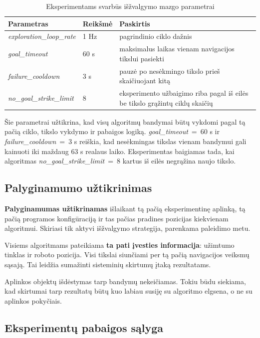 \documentclass[]{VUMIFTemplateClass}
\begin{document}
\begin{table}[H]
\centering
\caption{Eksperimentams svarbūs išžvalgymo mazgo parametrai}
\label{tab:config-params}
\small
\setlength{\tabcolsep}{5pt}
\begin{tabular}{|l|l|p{}|}
\hline
\textbf{Parametras} & \textbf{Reikšmė} & \textbf{Paskirtis} \\
\hline
\textit{exploration\_loop\_rate} & 1 Hz & pagrindinio ciklo dažnis \\
\hline
\textit{goal\_timeout} & 60 s & maksimalus laikas vienam navigacijos tikslui pasiekti \\
\hline
\textit{failure\_cooldown} & 3 s & pauzė po nesėkmingo tikslo prieš skaičiuojant kitą \\
\hline
\textit{no\_goal\_strike\_limit} & 8 & eksperimento užbaigimo riba pagal iš eilės be tikslo grąžintų ciklų skaičių \\
\hline
\end{tabular}
\end{table}

Šie parametrai užtikrina, kad visų algoritmų bandymai būtų vykdomi pagal tą pačią ciklo, tikslo vykdymo ir pabaigos logiką. \textit{goal\_timeout}~=~60 s ir
\textit{failure\_cooldown}~=~3 s reiškia, kad nesėkmingas tikslas vienam bandymui gali kainuoti iki maždaug 63 s realaus laiko. Eksperimentas baigiamas tada,
kai algoritmas \textit{no\_goal\_strike\_limit}~=~8 kartus iš eilės negrąžina naujo tikslo.

\subsection{Palyginamumo užtikrinimas}

\textbf{Palyginamumas užtikrinamas} išlaikant tą pačią eksperimentinę aplinką, tą pačią programos konfigūraciją ir tas pačias pradines pozicijas kiekvienam algoritmui.
Skiriasi tik aktyvi išžvalgymo strategija, parenkama paleidimo metu.

Visiems algoritmams pateikiama \textbf{ta pati įvesties informacija}: užimtumo tinklas ir roboto pozicija. Visi tikslai siunčiami per tą pačią navigacijos veiksmų sąsają.
Tai leidžia sumažinti sisteminių skirtumų įtaką rezultatams.

Aplinkos objektų išdėstymas tarp bandymų nekeičiamas. Tokiu būdu siekiama, kad skirtumai tarp rezultatų būtų kuo labiau susiję su algoritmo elgsena, o ne su
aplinkos pokyčiais.

\subsection{Eksperimentų pabaigos sąlyga}
\end{document}
